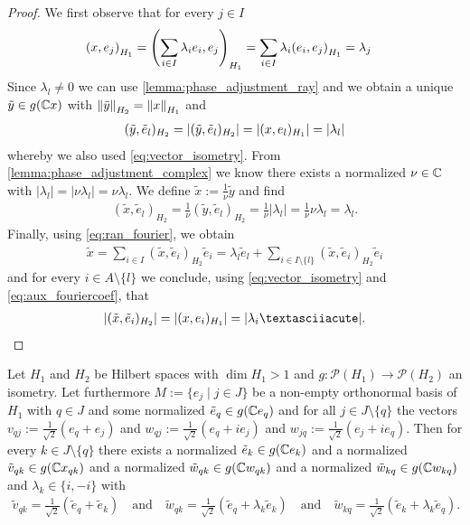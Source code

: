 \begin{proof}
	We first observe that for every $j \in I$ 
	\begin{align}
		\pbraces{x, e_j}_{H_1} &= \pbraces{\sum_{i \in I} \lambda_i e_i, e_j}_{H_1} = \sum_{i \in I} \lambda_i \pbraces{e_i, e_j}_{H_1} = \lambda_j \label{eq:aux_fouriercoef}
	\end{align}
	Since $\lambda_l \neq 0$ we can use \ref{lemma:phase_adjustment_ray} and we obtain a unique $\tilde{y} \in g(\C x)$ with $\norm[H_2]{\tilde{y}} = \norm[H_1]{x}$ and 
	\begin{align*}
		(\tilde{y}, \tilde{e}_l)_{H_2} = |(\tilde{y}, \tilde{e}_l)_{H_2}| = |(x, e_l)_{H_1}| = \vbraces{\lambda_l}
	\end{align*}
	whereby we also used \eqref{eq:vector_isometry}. From \ref{lemma:phase_adjustment_complex} we know there exists a normalized $\nu \in \C$ with $|\lambda_l| = |\nu \lambda_l| = \nu \lambda_l$. We define $\tilde{x} := \frac{1}{\nu} \tilde{y}$ and find
	\begin{align*}
		(\tilde{x}, \tilde{e}_l)_{H_2} = \frac{1}{\nu} (\tilde{y}, \tilde{e}_l)_{H_2} = \frac{1}{\nu} |\lambda_l| = \frac{1}{\nu} \nu \lambda_l = \lambda_l.
	\end{align*} 
	Finally, using \eqref{eq:ran_fourier}, we obtain
	\begin{align*}
		\tilde{x} = \sum_{i \in I} (\tilde{x}, \tilde{e}_i)_{H_2} \tilde{e}_i = \lambda_l \tilde{e}_l + \sum_{i \in I \setminus \{l\}} (\tilde{x}, \tilde{e}_i)_{H_2} \tilde{e}_i 
	\end{align*}
	and for every $i \in A \setminus \{l\}$ we conclude, using \eqref{eq:vector_isometry} and \eqref{eq:aux_fouriercoef}, that
	\begin{align*}
		\vbraces{(\tilde{x}, \tilde{e}_i)_{H_2}} = |(x, e_i)_{H_1}| = |\lambda_i´|.
	\end{align*}
\end{proof}


\begin{lemma} \label{lemma:function_on_onb}
	Let $H_1$ and $H_2$ be Hilbert spaces with $\dim H_1 > 1$ and $g: \mathcal{P}(H_1) \to \mathcal{P}(H_2)$ an isometry. Let furthermore $M := \{e_j \mid j \in J\}$ be a non-empty orthonormal basis of $H_1$ with $q \in J$ and some normalized $\tilde{e}_q \in g(\C e_q)$  and for all $j \in J \setminus \{q\}$ the vectors $v_{qj} := \frac{1}{\sqrt{2}} (e_q + e_j)$ and $w_{qj} := \frac{1}{\sqrt{2}}(e_q + ie_j)$ and $w_{jq} := \frac{1}{\sqrt{2}}(e_j + ie_q)$. Then for every $k \in J \setminus \{q\}$ there exists a normalized $\tilde{e}_k \in g(\C e_k)$ and a normalized $\tilde{v}_{qk} \in g(\C x_{qk})$ and a normalized $\tilde{w}_{qk} \in g(\C w_{qk})$ and a normalized $\tilde{w}_{kq} \in g(\C w_{kq})$ and $\lambda_k \in \{i, -i\}$ with
	\begin{align*}
		\tilde{v}_{qk} = \frac{1}{\sqrt{2}}(\tilde{e}_{q} + \tilde{e}_k) \quad \text{and} \quad \tilde{w}_{qk} = \frac{1}{\sqrt{2}}(\tilde{e}_q + \lambda_k \tilde{e}_k) \quad \text{and} \quad \tilde{w}_{kq} = \frac{1}{\sqrt{2}} (\tilde{e}_k + \lambda_k \tilde{e}_q).
	\end{align*}
\end{lemma}

